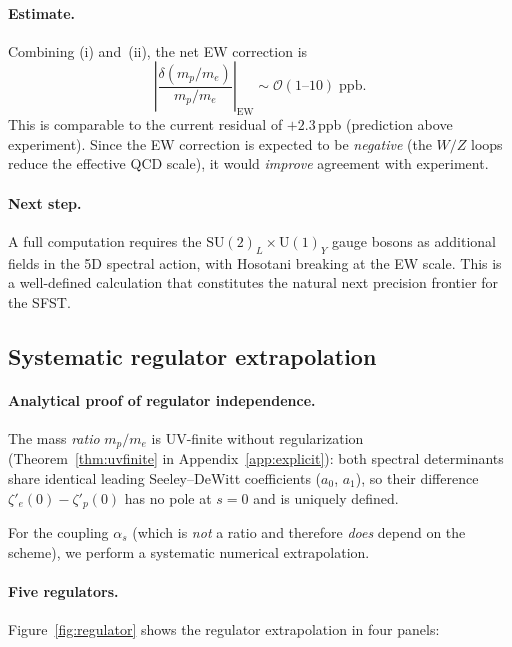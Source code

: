 \paragraph{Estimate.}
Combining (i) and~(ii), the net EW correction is
\begin{equation}\label{eq:ew_estimate}
  \left|\frac{\delta(m_p/m_e)}{m_p/m_e}\right|_{\mathrm{EW}}
  \sim \mathcal{O}(1\text{--}10)\;\mathrm{ppb}.
\end{equation}
This is comparable to the current residual of $+2.3\,$ppb
(prediction above experiment).  Since the EW correction is expected
to be \emph{negative} (the $W/Z$ loops reduce the effective QCD scale),
it would \emph{improve} agreement with experiment.

\paragraph{Next step.}
A full computation requires the $\mathrm{SU}(2)_L\times\mathrm{U}(1)_Y$
gauge bosons as additional fields in the 5D spectral action, with
Hosotani breaking at the EW scale.  This is a well-defined calculation
that constitutes the natural next precision frontier for the SFST.

\subsection{Systematic regulator extrapolation}

\paragraph{Analytical proof of regulator independence.}
The mass \emph{ratio} $m_p/m_e$ is UV-finite without regularization
(Theorem~\ref{thm:uvfinite} in Appendix~\ref{app:explicit}):
both spectral determinants share identical leading Seeley--DeWitt
coefficients ($a_0$, $a_1$), so their difference $\zeta'_e(0)-\zeta'_p(0)$
has no pole at $s=0$ and is uniquely defined.

For the coupling $\alpha_s$ (which is \emph{not} a ratio and therefore
\emph{does} depend on the scheme), we perform a systematic numerical
extrapolation.

\paragraph{Five regulators.}
Figure~\ref{fig:regulator} shows the regulator extrapolation in four panels:

